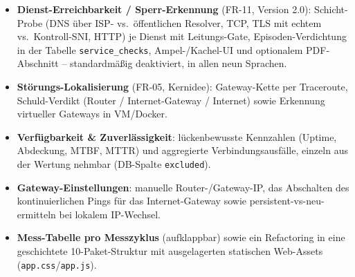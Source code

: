 \begin{itemize}
  \item \textbf{Dienst-Erreichbarkeit / Sperr-Erkennung} (FR-11, Version 2.0): Schicht-Probe
    (DNS über ISP- vs.\ öffentlichen Resolver, TCP, TLS mit echtem vs.\ Kontroll-SNI, HTTP)
    je Dienst mit Leitungs-Gate, Episoden-Verdichtung in der Tabelle \texttt{service\_checks},
    Ampel-/Kachel-UI und optionalem PDF-Abschnitt -- standardmäßig deaktiviert, in allen neun Sprachen.
  \item \textbf{Störungs-Lokalisierung} (FR-05, Kernidee): Gateway-Kette per Traceroute,
    Schuld-Verdikt (Router / Internet-Gateway / Internet) sowie Erkennung virtueller
    Gateways in VM/Docker.
  \item \textbf{Verfügbarkeit \& Zuverlässigkeit}: lückenbewusste Kennzahlen (Uptime,
    Abdeckung, MTBF, MTTR) und aggregierte Verbindungsausfälle, einzeln aus der Wertung
    nehmbar (DB-Spalte \texttt{excluded}).
  \item \textbf{Gateway-Einstellungen}: manuelle Router-/Gateway-IP, das Abschalten des
    kontinuierlichen Pings für das Internet-Gateway sowie persistent-vs-neu-ermitteln bei
    lokalem IP-Wechsel.
  \item \textbf{Mess-Tabelle pro Messzyklus} (aufklappbar) sowie ein Refactoring in eine
    geschichtete 10-Paket-Struktur mit ausgelagerten statischen Web-Assets (\texttt{app.css}/\texttt{app.js}).
\end{itemize}

